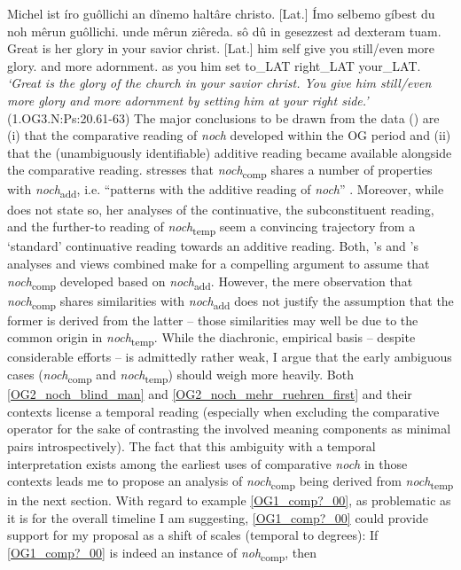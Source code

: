 \documentclass[output=paper,
modfonts
]{langscibook}
\begin{document}
\ea\gll Michel ist íro guôllichi an dînemo haltâre christo. [Lat.] Ímo selbemo gíbest du noh mêrun guôllichi. unde mêrun ziêreda. sô dû in gesezzest ad dexteram tuam.\\
       Great is her glory in your savior christ. [Lat.] him self give you still/even more glory. and more adornment. as you him set to\_LAT right\_LAT your\_LAT.\\
\glt   \textit{`Great is the glory of the church in your savior christ. You give him still/even more glory and more adornment by setting him at your right side.'}\label{OG3_noch_more_glory_first} \\ \flushright \vspace{-24pt} (1.OG3.N:Ps:20.61-63)
\z
The major conclusions to be drawn from the data () are (i) that the comparative reading of \textit{noch} developed within the OG period and (ii) that the (unambiguously identifiable) additive reading became available alongside the comparative reading. \citeauthor{umbach2009a_comp} \citeyearpar{umbach2009a_comp} stresses that \textit{noch}\textsubscript{comp} shares a number of properties with \textit{noch}\textsubscript{add}, i.e. ``patterns with the additive reading of \textit{noch}'' \citep[p.9]{umbach2009a_comp}. Moreover, while \citeauthor{beck2016a_sub} does not state so, her \citeyearpar{beck2016a_sub} analyses of the continuative, the subconstituent reading, and the further-to reading of \textit{noch}\textsubscript{temp} seem a convincing trajectory from a `standard' continuative reading towards an additive reading. Both, \citeauthor{umbach2009a_comp}'s \citeyearpar{umbach2009a_comp} and \citeauthor{beck2016a_sub}'s \citeyearpar{beck2016a_sub} analyses and views combined make for a compelling argument to assume that \textit{noch}\textsubscript{comp} developed based on \textit{noch}\textsubscript{add}. However, the mere observation that \textit{noch}\textsubscript{comp} shares similarities with \textit{noch}\textsubscript{add} does not justify the assumption that the former is derived from the latter -- those similarities may well be due to the common origin in \textit{noch}\textsubscript{temp}. While the diachronic, empirical basis -- despite considerable efforts -- is admittedly rather weak, I argue that the early ambiguous cases (\textit{noch}\textsubscript{comp} and \textit{noch}\textsubscript{temp}) should weigh more heavily. Both \ref{OG2_noch_blind_man} and \ref{OG2_noch_mehr_ruehren_first} and their contexts license a temporal reading (especially when excluding the comparative operator for the sake of contrasting the involved meaning components as minimal pairs introspectively). The fact that this ambiguity with a temporal interpretation exists among the earliest uses of comparative \textit{noch} in those contexts leads me to propose an analysis of \textit{noch}\textsubscript{comp} being derived from \textit{noch}\textsubscript{temp} in the next section. With regard to example \ref{OG1_comp?_00}, as problematic as it is for the overall timeline I am suggesting, \ref{OG1_comp?_00} could provide support for my proposal as a shift of scales (temporal to degrees): If \ref{OG1_comp?_00} is indeed an instance of \textit{noh}\textsubscript{comp}, then 
\end{document}
